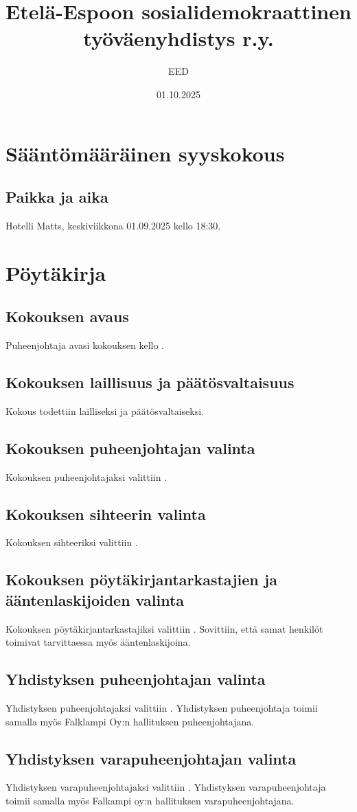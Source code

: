 \documentclass[a4paper,12pt]{article}
\title{Etelä-Espoon sosialidemokraattinen työväenyhdistys r.y.}
\author{EED}
\date{01.10.2025}
\begin{document}
\maketitle
\tableofcontents
\section*{Sääntömääräinen syyskokous}
\subsection*{Paikka ja aika}
Hotelli Matts, keskiviikkona 01.09.2025 kello 18:30.
\section*{Pöytäkirja}
\subsection{Kokouksen avaus}
Puheenjohtaja avasi kokouksen kello .
\subsection{Kokouksen laillisuus ja päätösvaltaisuus}
Kokous todettiin lailliseksi ja päätösvaltaiseksi.
\subsection{Kokouksen puheenjohtajan valinta}
Kokouksen puheenjohtajaksi valittiin .
\subsection{Kokouksen sihteerin valinta}
Kokouksen sihteeriksi valittiin .
\subsection{Kokouksen pöytäkirjantarkastajien ja ääntenlaskijoiden valinta}
Kokouksen pöytäkirjantarkastajiksi valittiin . Sovittiin, että samat henkilöt toimivat tarvittaessa myös ääntenlaskijoina.
\subsection{Yhdistyksen puheenjohtajan valinta}
Yhdistyksen puheenjohtajaksi valittiin . Yhdistyksen puheenjohtaja toimii samalla myös Falklampi Oy:n hallituksen puheenjohtajana.
\subsection{Yhdistyksen varapuheenjohtajan valinta}
Yhdistyksen varapuheenjohtajaksi valittiin . Yhdistyksen varapuheenjohtaja toimii samalla myös Falkampi oy:n hallituksen varapuheenjohtajana.
\end{document}
